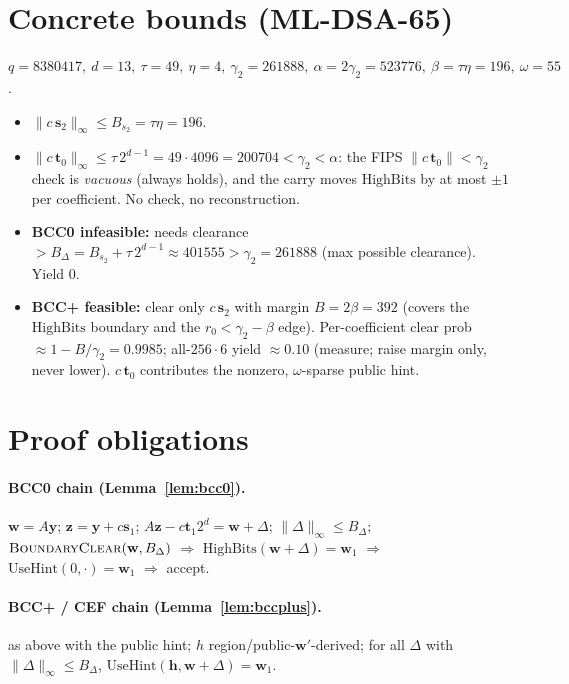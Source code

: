 \documentclass[11pt]{article}
\theoremstyle{remark}\newtheorem{remark}{Remark}
\begin{document}
\section{Concrete bounds (ML-DSA-65)}
\label{sec:bounds}
$q{=}8380417,\ d{=}13,\ \tau{=}49,\ \eta{=}4,\ \gamma_2{=}261888,\
\alpha{=}2\gamma_2{=}523776,\ \beta{=}\tau\eta{=}196,\ \omega{=}55$.
\begin{itemize}
\item $\|c\,\mathbf s_2\|_\infty \le B_{s_2} = \tau\eta = 196$.
\item $\|c\,\mathbf t_0\|_\infty \le \tau\,2^{d-1} = 49\cdot4096 = 200704
  < \gamma_2 < \alpha$: the FIPS $\|c\,\mathbf t_0\|<\gamma_2$ check is
  \emph{vacuous} (always holds), and the carry moves $\mathrm{HighBits}$
  by at most $\pm1$ per coefficient. No check, no reconstruction.
\item \textbf{BCC0 infeasible:} needs clearance $> B_\Delta = B_{s_2} +
  \tau\,2^{d-1} \approx 401555 > \gamma_2 = 261888$ (max possible
  clearance). Yield $0$.
\item \textbf{BCC+ feasible:} clear only $c\,\mathbf s_2$ with margin $B =
  2\beta = 392$ (covers the $\mathrm{HighBits}$ boundary and the $r_0 <
  \gamma_2-\beta$ edge). Per-coefficient clear prob $\approx 1 -
  B/\gamma_2 = 0.9985$; all-$256{\cdot}6$ yield $\approx 0.10$ (measure;
  raise margin only, never lower). $c\,\mathbf t_0$ contributes the
  nonzero, $\omega$-sparse public hint.
\end{itemize}

\section{Proof obligations}
\paragraph{BCC0 chain (Lemma~\ref{lem:bcc0}).} $\mathbf w{=}A\mathbf y$;
$\mathbf z{=}\mathbf y{+}c\mathbf s_1$; $A\mathbf z{-}c\mathbf t_1 2^d
{=}\mathbf w{+}\Delta$; $\|\Delta\|_\infty\le B_\Delta$;
$\textsc{BoundaryClear}(\mathbf w,B_\Delta)$ $\Rightarrow$
$\mathrm{HighBits}(\mathbf w{+}\Delta){=}\mathbf w_1$ $\Rightarrow$
$\mathrm{UseHint}(0,\cdot){=}\mathbf w_1$ $\Rightarrow$ accept.
\paragraph{BCC+ / CEF chain (Lemma~\ref{lem:bccplus}).} as above with the
public hint; $h$ region/public-$\mathbf w'$-derived; for all $\Delta$ with
$\|\Delta\|_\infty\le B_\Delta$, $\mathrm{UseHint}(\mathbf h,\mathbf w{+}
\Delta){=}\mathbf w_1$.
\end{document}
